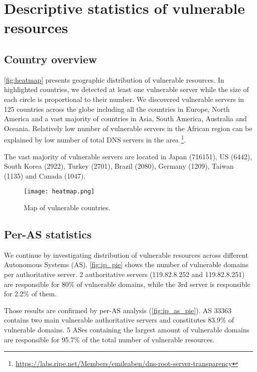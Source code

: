 \section{Descriptive statistics of vulnerable resources}
\subsection{Country overview}
\autoref{fig:heatmap} presents geographic distribution of vulnerable resources. In highlighted countries, we detected at least one vulnerable server while the size of each circle is proportional to their number. We discovered vulnerable servers in 125 countries across the globe including all the countries in Europe, North America and a vast majority of countries in Asia, South America, Australia and Oceania. Relatively low number of vulnerable servers in the African region can be explained by low number of total DNS servers in the area \footnote{\url{https://labs.ripe.net/Members/emileaben/dns-root-server-transparency}}. 

The vast majority of vulnerable servers are located in Japan (716151), US (6442), South Korea (2922), Turkey (2701), Brazil (2080), Germany (1209), Taiwan (1135) and Canada (1047). 


\begin{figure}[!hbt]
\centering
\texttt{[image: heatmap.png]}
\caption{Map of vulnerable countries.}
\label{fig:heatmap}
\end{figure}

\subsection{Per-AS statistics}
We continue by investigating distribution of vulnerable resources across different Autonomous Systems (AS). \autoref{fig:ip_pie} shows the number of vulnerable domains per authoritative server. 2 authoritative servers (119.82.8.252 and 119.82.8.251) are responsible for 80\% of vulnerable domains, while the 3rd server is responsible for 2.2\% of them. 

Those results are confirmed by per-AS analysis (\autoref{fig:ip_as_pie}). AS 33363 contains two main vulnerable authoritative servers and constitutes 83.9\% of vulnerable domains. 5 ASes containing the largest amount of vulnerable domains are responsible for 95.7\% of the total number of vulnerable resources. 

